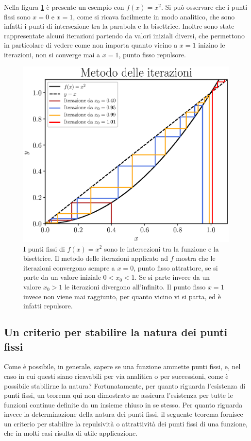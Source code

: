 Nella figura \ref{fig:iterazioni} è presente un esempio con $f(x) = x^2$. Si può osservare che i punti fissi sono $x = 0$ e $x=1$, come si ricava facilmente in modo analitico, che sono infatti i punti di intersezione tra la parabola e la bisettrice. Inoltre sono state rappresentate alcuni iterazioni partendo da valori iniziali diversi, che permettono in particolare di vedere come non importa quanto vicino a $x=1$ inizino le iterazioni, non si converge mai a $x = 1$, punto fisso repulsore.

\begin{figure}[h!]
    \begin{center}
    \includegraphics[scale=0.7]{Immagini/iterazioni.eps}
    \captionsetup{width=.8\linewidth}
    \caption{I punti fissi di $f(x) = x^2$ sono le intersezioni tra la funzione e la bisettrice. Il metodo delle iterazioni applicato ad $f$ mostra che le iterazioni convergono sempre a $x=0$, punto fisso attrattore, se si parte da un valore iniziale $0<x_0<1$. Se si parte invece da un valore $x_0 > 1$ le iterazioni divergono all'infinito. Il punto fisso $x=1$ invece non viene mai raggiunto, per quanto vicino vi si parta, ed è infatti repulsore.}
    \label{fig:iterazioni}
    \end{center}
\end{figure}


\subsection{Un criterio per stabilire la natura dei punti fissi}
Come è possibile, in generale, sapere se una funzione ammette punti fissi, e, nel caso in cui questi siano ricavabili per via analitica o per successioni, come è possibile stabilirne la natura? Fortunatamente, per quanto riguarda l'esistenza di punti fissi, un teorema qui non dimostrato ne assicura l'esistenza per tutte le funzioni continue definite da un insieme chiuso in se stesso. Per quanto riguarda invece la determinazione della natura dei punti fissi, il seguente teorema fornisce un criterio per stabilire la repulsività o attrattività dei punti fissi di una funzione, che in molti casi risulta di utile applicazione.

